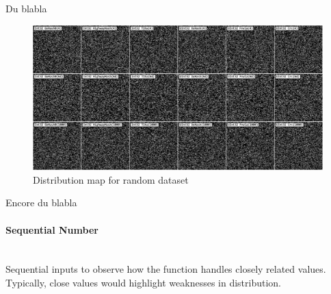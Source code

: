 \documentclass[10pt]{article}
\begin{document}
Du blabla

\begin{figure}[H]
\centering
\includegraphics[width=1\textwidth]{quality-random.png}
\caption{Distribution map for random dataset}
\label{fig:quality-random}
\end{figure}

Encore du blabla

\clearpage
\paragraph{Sequential Number}\leavevmode\\
Sequential inputs to observe how the function handles closely related values. Typically, close values would highlight weaknesses in distribution.
\end{document}
